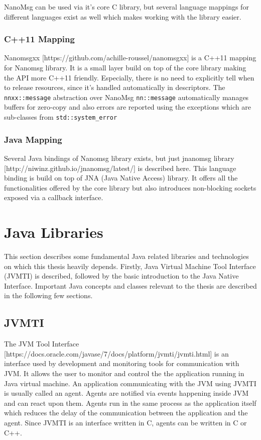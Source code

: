NanoMsg can be used via it's core C library, but several language mappings for different languages exist as well which makes working with the library easier.
\subsubsection{C++11 Mapping}
Nanomsgxx [https://github.com/achille-roussel/nanomsgxx] is a C++11 mapping for Nanomsg library. It is a small layer build on top of the core library making the API more C++11  friendly. Especially, there is no need to explicitly tell when to release resources, since it's handled automatically in descriptors. The \texttt{nnxx::message} abstraction over NanoMsg \texttt{nn::message} automatically manages buffers for zero-copy and also errors are reported using the exceptions which are sub-classes from \texttt{std::system\_error}
\subsubsection{Java Mapping}
Several Java bindings of Nanomsg library exists, but just jnanomsg library [http://niwinz.github.io/jnanomsg/latest/] is described here. This language binding is build on top of JNA (Java Native Access) library. It offers all the functionalities offered by the core library but also introduces non-blocking sockets exposed via a callback interface.

\section{Java Libraries}
This section describes some fundamental Java related libraries and technologies on which this thesis heavily depends. Firstly, Java Virtual Machine Tool Interface (JVMTI) is described, followed by the basic introduction to the Java Native Interface. Important Java concepts and classes relevant to the thesis are described in the following few sections.
\subsection{JVMTI}
\label{JVMTI}
The JVM Tool Interface [https://docs.oracle.com/javase/7/docs/platform/jvmti/jvmti.html] is an interface used by development and monitoring tools for communication with JVM. It allows the user to monitor and control the the application running in Java virtual machine. An application communicating with the JVM using JVMTI is usually called an agent. Agents are notified via events happening inside JVM and can react upon them. Agents run in the same process as the application itself which reduces the delay of the communication between the application and the agent. Since JVMTI is an interface written in C, agents can be written in C or C++. 

